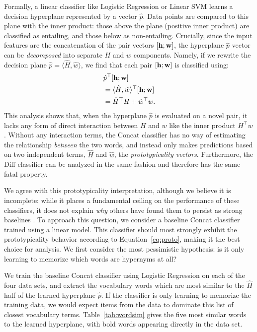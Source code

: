 Formally, a linear classifier like Logistic Regression or Linear SVM learns a
decision hyperplane represented by a vector $\hat p$.
Data points are compared to this plane with the
inner product: those above the plane (positive inner product) are classified as
entailing, and those below as non-entailing. Crucially, since the input
features are the concatenation of the pair vectors $[{\mathbf{h}}; {\mathbf{w}}]$, the hyperplane
$\hat p$ vector can be {\em decomposed} into separate $H$ and $w$ components.
Namely, if we rewrite the decision
plane $\hat p = \langle \hat H, \hat w\rangle$, we find that each pair
$[{\mathbf{h}}; {\mathbf{w}}]$ is classified using:
\begin{equation}\label{eq:proto}
\begin{aligned}
  & \hat p^{\top}[{\mathbf{h}}; {\mathbf{w}}]\\
  &= \langle \hat H, \hat w \rangle^{\top}[{\mathbf{h}}; {\mathbf{w}}]\\
  &= \hat H^{\top}H + \hat w^{\top}w.
\end{aligned}
\end{equation}
This analysis shows that, when the hyperplane $\hat p$ is evaluated on a novel
pair, it lacks any form of direct interaction between $H$ and $w$ like the
inner product $H^\top w$. Without any interaction terms, the Concat classifier
has no way of estimating the relationship {\em between} the two words, and
instead only makes predictions based on two independent terms, $\hat H$ and
$\hat w$, the {\em prototypicality vectors}.
Furthermore, the Diff
classifier can be analyzed in the same fashion and therefore has the same fatal
property.

We agree with this prototypicality interpretation, although we believe it is incomplete:
while it places a fundamental ceiling on the performance of these classifiers, it
does not explain {\em why} others have found them to persist as strong
baselines
\cite{weeds:2014:coling,roller:2014:coling,kruszewski:2015:tacl,vylomova:2016:acl}.
To approach this question, we consider a baseline Concat classifier trained
using a linear model. This classifier should most strongly exhibit the prototypicality
behavior according to Equation~\ref{eq:proto}, making it the best
choice for analysis. We first consider the most pessimistic hypothesis: is it
only learning to memorize which words are hypernyms at all?

We train the baseline Concat classifier using Logistic Regression on each of
the four data sets, and extract the vocabulary words which are most similar to
the $\hat H$ half of the learned hyperplane $\hat p$. If the classifier is only
learning to memorize the training data, we would expect items from the data to
dominate this list of closest vocabulary terms. Table~\ref{tab:wordsim}
gives the five most similar words to the learned hyperplane, with bold words
appearing directly in the data set.

